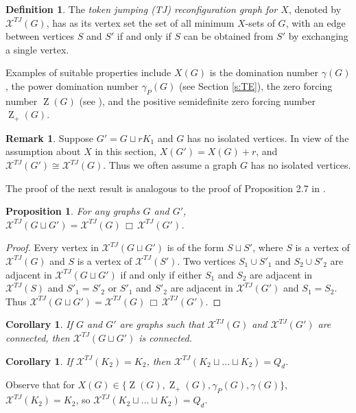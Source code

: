 \documentclass{article}
\numberwithin{figure}{section}   %
\newtheorem{cor}[thm]{Corollary}
\newtheorem{prop}[thm]{Proposition}
\theoremstyle{definition}
\newtheorem{rem}[thm]{Remark}
\theoremstyle{definition}
\newtheorem{defn}[thm]{Definition}
\theoremstyle{definition}
\newcommand{\cp}{\, \Box\,}
\newcommand{\Z}{\operatorname{Z}}
\newcommand{\Zp}{\operatorname{Z}_+}
\newcommand{\pd}{\gamma_P}
\newcommand{\xte}{\mathscr{X}^{TJ}}
\newcommand{\bj}[1]{{\textcolor{red}{[}\textcolor{red}{{BJ: \em #1}]}}}
\begin{document}
 

\begin{defn} The {\em token jumping (TJ) reconfiguration graph for $X$}, denoted by $\xte(G)$, has as its vertex set the set of all minimum $X$-sets of $G$, with an edge between vertices $S$ and $S'$ if and only if $S$ can be obtained from $S'$ by exchanging a single vertex.
\end{defn}


 Examples of suitable properties include $X(G)$ is the domination number $\gamma(G)$,
   the power domination number $\pd(G)$ (see Section \ref{s:TE}),  the zero forcing number $\Z(G)$ (see \cite{GHH}), and   the positive semidefinite zero forcing number $\Zp(G)$.

\begin{rem}\label{no-isol-vtx-te} Suppose $G'=G\sqcup rK_1$ and $G$ has no isolated vertices.   In view of the assumption about $X$ in this section,   $X(G')=X(G)+r$,  and $\xte(G')\cong\xte(G)$.   Thus we  often assume a graph $G$ has no isolated vertices. 
\end{rem}
The proof of the next result is analogous to the proof of Proposition 2.7 in \cite{GHH}.


\begin{prop}\label{disjoint_union-x}
For any graphs $G$ and $G'$, $\xte(G \sqcup G') = \xte(G) \cp \xte(G')$.
\end{prop}

\begin{proof} Every vertex in $\xte(G \sqcup G')$ is of the form $S \sqcup S'$, where $S$ is a vertex of $\xte(G)$ and $S$ is a vertex of $\xte(S')$. Two vertices $S_1 \cup S'_1$ and $S_2 \cup S'_2$ are adjacent in $\xte(G \sqcup G')$ if and only if either $S_1$ and $S_2$ are adjacent in $\xte(S)$ and $S'_1 = S'_2$ or $S'_1$ and $S'_2$ are adjacent in $\xte(G')$ and $S_1 = S_2$. Thus $\xte(G \sqcup G') = \xte(G) \cp \xte(G')$. \end{proof}

\begin{cor}\label{disjoint_connected-x}
If $G$ and $G'$ are graphs such that $\xte(G)$ and $\xte(G')$ are connected, then $\xte(G \sqcup G')$ is connected.
\end{cor}

\begin{cor}\label{c:hypercube} If $\xte(K_2)=K_2$, then $\xte(K_2\sqcup\dots\sqcup K_2)=Q_d$.
\end{cor}

Observe that for $X(G) \in \{\Z(G), \Zp(G), \pd(G), \gamma(G)\}$,
$\xte(K_2)=K_2$, so $\xte(K_2\sqcup\dots\sqcup K_2)=Q_d$.  
\end{document}
